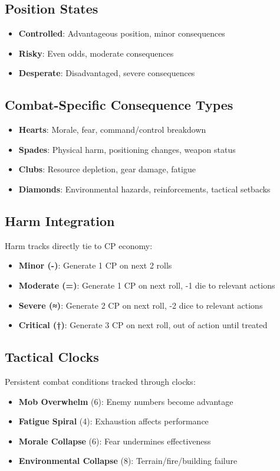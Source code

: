 \documentclass[11pt]{article}
\begin{document}
\subsection{Position States}
\begin{itemize}
    \item \textbf{Controlled}: Advantageous position, minor consequences
    \item \textbf{Risky}: Even odds, moderate consequences  
    \item \textbf{Desperate}: Disadvantaged, severe consequences
\end{itemize}

\subsection{Combat-Specific Consequence Types}
\begin{itemize}
    \item \textbf{Hearts}: Morale, fear, command/control breakdown
    \item \textbf{Spades}: Physical harm, positioning changes, weapon status
    \item \textbf{Clubs}: Resource depletion, gear damage, fatigue
    \item \textbf{Diamonds}: Environmental hazards, reinforcements, tactical setbacks
\end{itemize}

\subsection{Harm Integration}
Harm tracks directly tie to CP economy:
\begin{itemize}
    \item \textbf{Minor (-)}: Generate 1 CP on next 2 rolls
    \item \textbf{Moderate (=)}: Generate 1 CP on next roll, -1 die to relevant actions
    \item \textbf{Severe (≈)}: Generate 2 CP on next roll, -2 dice to relevant actions  
    \item \textbf{Critical (†)}: Generate 3 CP on next roll, out of action until treated
\end{itemize}

\subsection{Tactical Clocks}
Persistent combat conditions tracked through clocks:
\begin{itemize}
    \item \textbf{Mob Overwhelm} (6): Enemy numbers become advantage
    \item \textbf{Fatigue Spiral} (4): Exhaustion affects performance
    \item \textbf{Morale Collapse} (6): Fear undermines effectiveness
    \item \textbf{Environmental Collapse} (8): Terrain/fire/building failure
\end{itemize}
\end{document}
